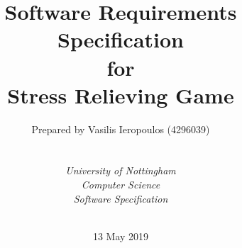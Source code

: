 

\def\Institute{\textit{University of Nottingham}}
\def\Course{\textit{Computer Science}}
\def\Module{\textit{ Software Specification}}



\def\BoldTitle{Software Requirements Specification}

\def\Subtitle{for \\ Stress Relieving Game \\}
\def\Authors{Prepared by Vasilis Ieropoulos (4296039) } 
\def\Shortname{V.Ieropoulos}

\title{\textbf{\BoldTitle}\\\Subtitle}
\author{\Authors \\ \\ \\ \Institute\\ \Course\\ \Module\\ \Docent\\ \Assistant}
\date{13 May 2019}

